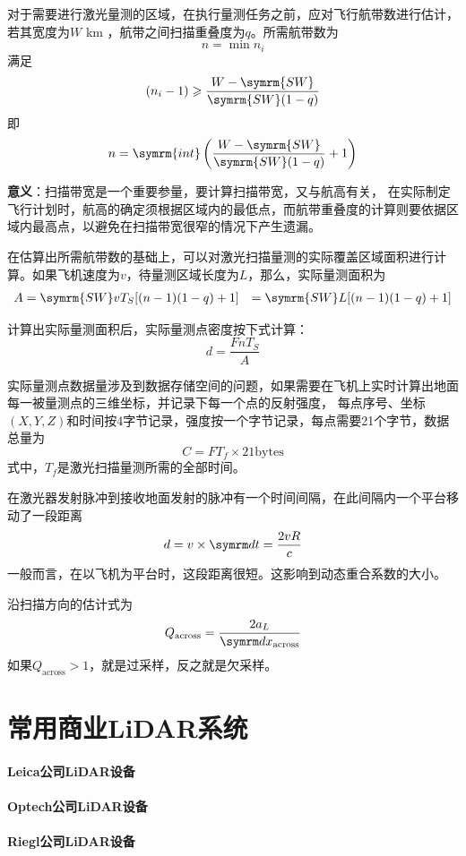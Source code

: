 对于需要进行激光量测的区域，在执行量测任务之前，应对飞行航带数进行估计，若其宽度为$ W $ km ，航带之间扫描重叠度为$ q $。所需航带数为
\begin{equation}
n = \min n_i
\end{equation}
满足
\begin{equation}
(n_i - 1) \geqslant \dfrac{W - \symrm{SW}}{\symrm{SW}(1-q)}
\end{equation}
即
\begin{equation}
n = \symrm{int} \left( \dfrac{W - \symrm{SW}}{\symrm{SW}(1-q)} + 1\right) 
\end{equation}

\textbf{意义}：扫描带宽是一个重要参量，要计算扫描带宽，又与航高有关，
在实际制定飞行计划时，航高的确定须根据区域内的最低点，而航带重叠度的计算则要依据区域内最高点，以避免在扫描带宽很窄的情况下产生遗漏。

在估算出所需航带数的基础上，可以对激光扫描量测的实际覆盖区域面积进行计算。如果飞机速度为$ v $，待量测区域长度为$ L $，那么，实际量测面积为
\begin{align}
A & = \symrm{SW} v T_S [(n - 1)(1 - q) + 1]
  & = \symrm{SW} L [(n - 1)(1 - q) + 1]
\end{align}

计算出实际量测面积后，实际量测点密度按下式计算：
\begin{equation}
d = \dfrac{FnT_S}{A}
\end{equation}

实际量测点数据量涉及到数据存储空间的问题，如果需要在飞机上实时计算出地面每一被量测点的三维坐标，并记录下每一个点的反射强度，
每点序号、坐标$ (X,Y,Z) $和时间按4字节记录，强度按一个字节记录，每点需要21个字节，数据总量为
\begin{equation}
C = FT_f \times 21 \text{bytes}
\end{equation}
式中，$ T_f $是激光扫描量测所需的全部时间。

在激光器发射脉冲到接收地面发射的脉冲有一个时间间隔，在此间隔内一个平台移动了一段距离
\begin{equation}
d = v \times \diff t = \dfrac{2vR}{c}
\end{equation}
一般而言，在以飞机为平台时，这段距离很短。这影响到动态重合系数的大小。

沿扫描方向的估计式为
\begin{equation}
Q_{\text{across}} = \dfrac{2a_L}{\diff x_{\text{across}}}
\end{equation}
如果$ Q_{\text{across}} > 1$，就是过采样，反之就是欠采样。

\section{常用商业LiDAR系统}
\paragraph{Leica公司LiDAR设备}
\paragraph{Optech公司LiDAR设备}
\paragraph{Riegl公司LiDAR设备}